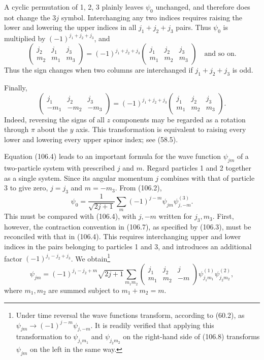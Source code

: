 A cyclic permutation of 1, 2, 3 plainly leaves $\psi_0$ unchanged, and therefore does not change the $3j$ symbol. Interchanging any two indices requires raising the lower and lowering the upper indices in all $j_1+j_2+j_3$ pairs. Thus $\psi_0$ is multiplied by $(-1)^{j_1+j_2+j_3}$, and
\begin{equation}
 \begin{pmatrix}j_2&j_1&j_3\\m_2&m_1&m_3\end{pmatrix}
 =(-1)^{j_1+j_2+j_3}\begin{pmatrix}j_1&j_2&j_3\\m_1&m_2&m_3\end{pmatrix}
 \quad\text{and so on}.
 \tag{106.5}
\end{equation}
Thus the sign changes when two columns are interchanged if $j_1+j_2+j_3$ is odd.

Finally,
\begin{equation}
 \begin{pmatrix}j_1&j_2&j_3\\-m_1&-m_2&-m_3\end{pmatrix}
 =(-1)^{j_1+j_2+j_3}\begin{pmatrix}j_1&j_2&j_3\\m_1&m_2&m_3\end{pmatrix}.
 \tag{106.6}
\end{equation}
Indeed, reversing the signs of all $z$ components may be regarded as a rotation through $\pi$ about the $y$ axis. This transformation is equivalent to raising every lower and lowering every upper spinor index; see (58.5).

Equation (106.4) leads to an important formula for the wave function $\psi_{jm}$ of a two-particle system with prescribed $j$ and $m$. Regard particles 1 and 2 together as a single system. Since its angular momentum $j$ combines with that of particle 3 to give zero, $j=j_3$ and $m=-m_3$. From (106.2),
\begin{equation}
 \psi_0=\frac1{\sqrt{2j+1}}\sum_m(-1)^{j-m}\psi_{jm}\psi^{(3)}_{j,-m}.
 \tag{106.7}
\end{equation}
This must be compared with (106.4), with $j,-m$ written for $j_3,m_3$. First, however, the contraction convention in (106.7), as specified by (106.3), must be reconciled with that in (106.4). This requires interchanging upper and lower indices in the pairs belonging to particles 1 and 3, and introduces an additional factor $(-1)^{j_1-j_2+j_3}$. We obtain\footnote{Under time reversal the wave functions transform, according to (60.2), as $\psi_{jm}\to(-1)^{j-m}\psi_{j,-m}$. It is readily verified that applying this transformation to $\psi_{j_1m_1}$ and $\psi_{j_2m_2}$ on the right-hand side of (106.8) transforms $\psi_{jm}$ on the left in the same way.}
\begin{equation}
 \psi_{jm}=(-1)^{j_1-j_2+m}\sqrt{2j+1}\sum_{m_1m_2}
 \begin{pmatrix}j_1&j_2&j\\m_1&m_2&-m\end{pmatrix}
 \psi^{(1)}_{j_1m_1}\psi^{(2)}_{j_2m_2},
 \tag{106.8}
\end{equation}
where $m_1,m_2$ are summed subject to $m_1+m_2=m$.

